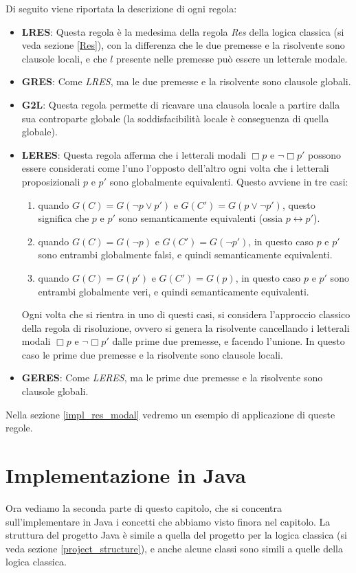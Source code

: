 \documentclass[a4paper,12pt]{report}
\newcommand{\tto} {\leftrightarrow}
\begin{document}
Di seguito viene riportata la descrizione di ogni regola:
\begin{itemize}
    \item \textbf{LRES}: Questa regola è la medesima della regola \emph{Res} della logica classica (si veda sezione \ref{Res}), con la differenza che le due premesse e la risolvente sono clausole locali, e che $l$ presente nelle premesse può essere un letterale modale.
    \item \textbf{GRES}: Come \emph{LRES}, ma le due premesse e la risolvente sono clausole globali.
    \item \textbf{G2L}: Questa regola permette di ricavare una clausola locale a partire dalla sua controparte globale (la soddisfacibilità locale è conseguenza di quella globale).
    \item \textbf{LERES}: Questa regola afferma che i letterali modali $\Box p$ e $\lnot \Box p'$ possono essere considerati come l'uno l'opposto dell'altro ogni volta che i letterali proposizionali $p$ e $p'$ sono globalmente equivalenti. Questo avviene in tre casi: \begin{enumerate}
        \item quando $G(C) = G(\lnot p \lor p')$ e $G(C') = G(p \lor \lnot p')$, questo significa che $p$ e $p'$ sono semanticamente equivalenti (ossia $p \tto p'$).
        \item quando $G(C) = G(\lnot p)$ e $G(C') = G(\lnot p')$, in questo caso $p$ e $p'$ sono entrambi globalmente falsi, e quindi semanticamente equivalenti.
        \item quando $G(C) = G(p')$ e $G(C') = G(p)$, in questo caso $p$ e $p'$ sono entrambi globalmente veri, e quindi semanticamente equivalenti.
    \end{enumerate}
    Ogni volta che si rientra in uno di questi casi, si considera l'approccio classico della regola di risoluzione, ovvero si genera la risolvente cancellando i letterali modali $\Box p$ e $\lnot \Box p'$ dalle prime due premesse, e facendo l'unione. In questo caso le prime due premesse e la risolvente sono clausole locali.
    \item \textbf{GERES}: Come \emph{LERES}, ma le prime due premesse e la risolvente sono clausole globali.
\end{itemize}
Nella sezione \ref{impl_res_modal} vedremo un esempio di applicazione di queste regole.

\section*{Implementazione in Java}
Ora vediamo la seconda parte di questo capitolo, che si concentra sull'implementare in Java i concetti che abbiamo visto finora nel capitolo. La struttura del progetto Java è simile a quella del progetto per la logica classica (si veda sezione \ref{project_structure}), e anche alcune classi sono simili a quelle della logica classica.
\end{document}
